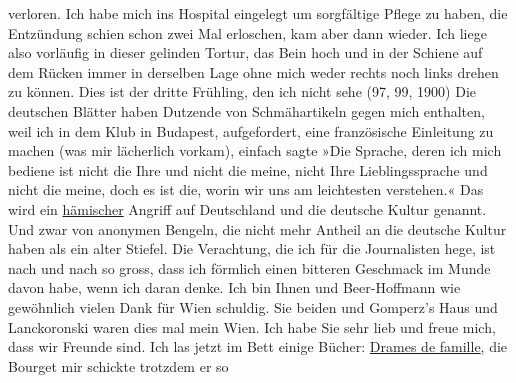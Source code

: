 \begin{ledgroupsized}[t]{13cm}
               verloren. Ich habe mich ins Hospital eingelegt um sorgfältige Pflege zu haben, die
               Entzündung schien schon zwei Mal erloschen, kam aber dann wieder. Ich liege also
               vorläufig in dieser gelinden Tortur, das Bein hoch und in der Schiene {\pb}auf dem Rücken immer in derselben
               Lage ohne mich weder rechts noch links drehen zu können.\pend
           \pstart
           Dies ist der dritte Frühling, den ich nicht sehe (97, 99,
                  1900)\pend
           \pstart
           Die deutschen Blätter haben Dutzende von Schmähartikeln gegen mich enthalten, weil
               ich in dem Klub in Budapest,
               aufgefordert, eine französische Einleitung zu
               machen (was mir lächerlich vorkam), einfach sagte »Die Sprache, deren ich mich
               bediene ist nicht die Ihre und nicht die meine, nicht Ihre Lieblingssprache und nicht
               die meine, doch es ist die, worin wir uns am leichtesten verstehen.« Das wird ein \uline{hämischer} Angriff auf Deutschland und die deutsche Kultur genannt. Und zwar von anonymen Bengeln,
               die nicht mehr Antheil an die deutsche Kultur haben als ein alter Stiefel. Die Verachtung, die ich für die Journalisten {\pb}hege, ist nach und nach so gross,
               dass ich förmlich einen bitteren Geschmack im Munde davon habe, wenn ich daran
               denke.\pend
           \pstart
           Ich bin Ihnen und Beer-Hoffmann wie gewöhnlich
               vielen Dank für Wien schuldig.\pend
           \pstart
           Sie beiden und Gomperz’s Haus und Lanckoronski waren dies mal mein Wien. Ich habe Sie sehr lieb und freue mich, dass
               wir Freunde sind.\pend
           \pstart
           Ich las jetzt im Bett einige Bücher: \uline{Drames de famille}, die Bourget mir schickte trotzdem er so

\end{ledgroupsized}
